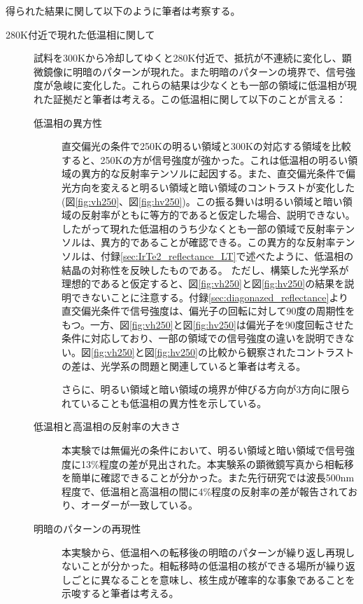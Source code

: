\documentclass[11pt,a4paper]{jsarticle}
\begin{document}
得られた結果に関して以下のように筆者は考察する。
\begin{description}
\item[280K付近で現れた低温相に関して]
\item[]
試料を300Kから冷却してゆくと280K付近で、抵抗が不連続に変化し、顕微鏡像に明暗のパターンが現れた。また明暗のパターンの境界で、信号強度が急峻に変化した。これらの結果は少なくとも一部の領域に低温相が現れた証拠だと筆者は考える。この低温相に関して以下のことが言える：

\begin{description}
\item[低温相の異方性]
直交偏光の条件で250Kの明るい領域と300Kの対応する領域を比較すると、250Kの方が信号強度が強かった。これは低温相の明るい領域の異方的な反射率テンソルに起因する。また、直交偏光条件で偏光方向を変えると明るい領域と暗い領域のコントラストが変化した(図\ref{fig:vh250}、図\ref{fig:hv250})。この振る舞いは明るい領域と暗い領域の反射率がともに等方的であると仮定した場合、説明できない。したがって現れた低温相のうち少なくとも一部の領域で反射率テンソルは、異方的であることが確認できる。この異方的な反射率テンソルは、付録\ref{sec:IrTe2_reflectance_LT}で述べたように、低温相の結晶の対称性を反映したものである。
ただし、構築した光学系が理想的であると仮定すると、図\ref{fig:vh250}と図\ref{fig:hv250}の結果を説明できないことに注意する。付録\ref{sec:diagonazed_reflectance}より直交偏光条件で信号強度は、偏光子の回転に対して90度の周期性をもつ。一方、図\ref{fig:vh250}と図\ref{fig:hv250}は偏光子を90度回転させた条件に対応しており、一部の領域での信号強度の違いを説明できない。図\ref{fig:vh250}と図\ref{fig:hv250}の比較から観察されたコントラストの差は、光学系の問題と関連していると筆者は考える。

さらに、明るい領域と暗い領域の境界が伸びる方向が3方向に限られていることも低温相の異方性を示している。

\item[低温相と高温相の反射率の大きさ]
本実験では無偏光の条件において、明るい領域と暗い領域で信号強度に13\%程度の差が見出された。本実験系の顕微鏡写真から相転移を簡単に確認できることが分かった。また先行研究\cite{reflectance_IrTe2}では波長500nm程度で、低温相と高温相の間に4\%程度の反射率の差が報告されており、オーダーが一致している。

\item[明暗のパターンの再現性]
本実験から、低温相への転移後の明暗のパターンが繰り返し再現しないことが分かった。相転移時の低温相の核ができる場所が繰り返しごとに異なることを意味し、核生成が確率的な事象であることを示唆すると筆者は考える。


\end{description}
\end{description}
\end{document}
